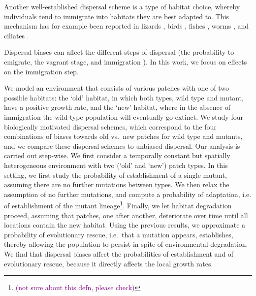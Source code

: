 \documentclass[11pt]{article}
\newcommand{\florence}[1]{\textcolor{purple}{(#1)}} %
\newcommand{\chg}[1]{\textcolor{change}{#1}}
\begin{document}
Another well-established dispersal scheme is a type of habitat choice, whereby individuals tend to immigrate into habitats they are best adapted to. This mechanism has for example been reported in lizards \citep{bestion_2015}, birds \citep{dreiss_2011,benkman_2017}, fishes \citep{bolnick_2009}, worms \citep{mathieu_2010}, and ciliates \citep{jacob_2017,jacob_2018}. 

 Dispersal biases can affect the different steps of dispersal (the probability to emigrate, the vagrant stage, and immigration \citep{bowler_2005,ronce_2007}). In this work, we focus on effects on the immigration step. 

We model an environment that consists of various patches with one of two possible habitats: the `old' habitat, in which both \chg{types, wild type and mutant, have a positive growth rate}, and the `new' habitat, where in the absence of immigration the wild-type population will eventually go extinct. We study four biologically motivated dispersal schemes, which correspond to the four combinations of biases towards old vs.\ new patches for wild type and mutants, and we compare these dispersal schemes to \chg{unbiased} dispersal. Our analysis is carried out step-wise. We first consider a temporally constant but spatially heterogeneous environment with two (`old' and `new') patch types. In this setting, we first study the probability of establishment of a single mutant, assuming there are no further mutations between types. We then relax the assumption of no further mutations, and compute a probability of adaptation, i.e. of establishment of the mutant lineage\footnote{\florence{not sure about this defn, please check}}. Finally, we let habitat degradation proceed, assuming that patches, one after \chg{another}, deteriorate over time until all locations contain the new habitat. Using the previous results, we approximate a probability of evolutionary rescue, i.e.\ that a mutation appears, establishes, thereby allowing the population to persist in spite of environmental degradation. We find that dispersal biases affect the probabilities of establishment and of evolutionary rescue, because it directly affects the local growth rates. 

\end{document}
